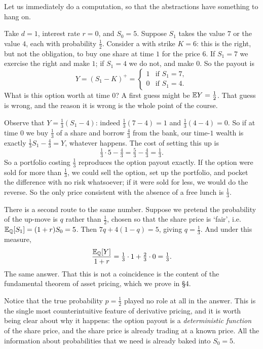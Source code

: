 \documentclass[a4paper]{scrartcl}
\newcommand{\QQ}{\mathbb{Q}}
\begin{document}
Let us immediately do a computation, so that the abstractions have something to hang on.

\begin{example}
	Take $d = 1$, interest rate $r = 0$, and $S_0 = 5$. Suppose $S_1$ takes the value $7$ or the value $4$, each with probability $\tfrac12$. Consider a  with strike $K = 6$: this is the right, but not the obligation, to buy one share at time $1$ for the price $6$. If $S_1 = 7$ we exercise the right and make $1$; if $S_1 = 4$ we do not, and make $0$. So the payout is
	$$
	Y = (S_1 - K)^+ = \begin{cases} 1 & \text{if } S_1 = 7,\\ 0 & \text{if } S_1 = 4.\end{cases}
	$$
	What is this option worth at time $0$? A first guess might be $\mathbb{E} Y = \tfrac12$. That guess is wrong, and the reason it is wrong is the whole point of the course.

	Observe that $Y = \tfrac13(S_1 - 4)$: indeed $\tfrac13(7-4) = 1$ and $\tfrac13(4-4) = 0$. So if at time $0$ we buy $\tfrac13$ of a share and borrow $\tfrac43$ from the bank, our time-$1$ wealth is exactly $\tfrac13 S_1 - \tfrac43 = Y$, whatever happens. The cost of setting this up is
	$$
	\tfrac13 \cdot 5 - \tfrac43 = \tfrac53 - \tfrac43 = \tfrac13.
	$$
	So a portfolio costing $\tfrac13$ reproduces the option payout exactly. If the option were sold for more than $\tfrac13$, we could sell the option, set up the portfolio, and pocket the difference with no risk whatsoever; if it were sold for less, we would do the reverse. So the only price consistent with the absence of a free lunch is $\tfrac13$.

	There is a second route to the same number. Suppose we pretend the probability of the up-move is $q$ rather than $\tfrac12$, chosen so that the share price is `fair', i.e.\ $\EE_{\QQ}[S_1] = (1+r)S_0 = 5$. Then $7q + 4(1-q) = 5$, giving $q = \tfrac13$. And under this measure,
	$$
	\frac{\EE_\QQ[Y]}{1+r} = \tfrac13 \cdot 1 + \tfrac23 \cdot 0 = \tfrac13.
	$$
	The same answer. That this is not a coincidence is the content of the fundamental theorem of asset pricing, which we prove in \S4.
\end{example}

Notice that the true probability $p = \tfrac12$ played no role at all in the answer. This is the single most counterintuitive feature of derivative pricing, and it is worth being clear about why it happens: the option payout is a \emph{deterministic function} of the share price, and the share price is already trading at a known price. All the information about probabilities that we need is already baked into $S_0 = 5$.
\end{document}

